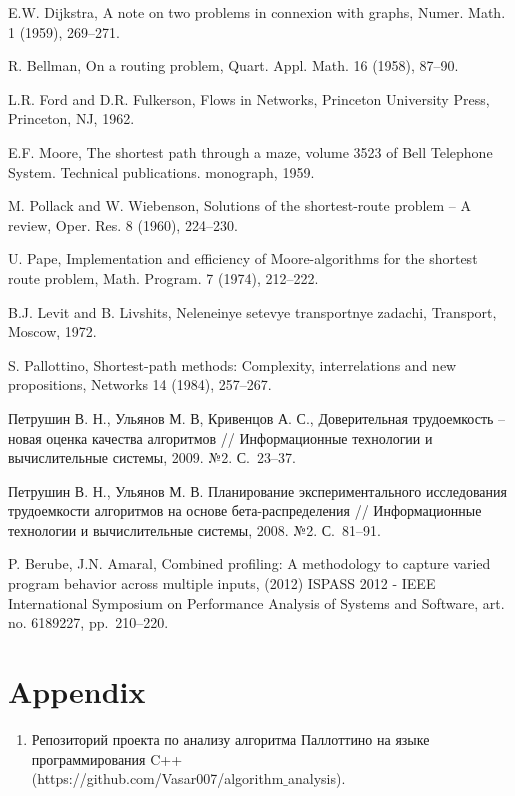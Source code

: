 \documentclass[a4paper]{article}
\begin{document}
\begin{enumerate}
	 E.W. Dijkstra, A note on two problems in connexion with graphs, Numer. Math. 1 (1959), 269–271.
	
	 R. Bellman, On a routing problem, Quart. Appl. Math. 16 (1958), 87–90.
	
	 L.R. Ford and D.R. Fulkerson, Flows in Networks, Princeton University Press, Princeton, NJ, 1962.
	
	 E.F. Moore, The shortest path through a maze, volume 3523 of Bell Telephone System. Technical publications. monograph, 1959.
	
	 M. Pollack and W. Wiebenson, Solutions of the shortest-route problem – A review, Oper. Res. 8 (1960), 224–230.
	
	 U. Pape, Implementation and efficiency of Moore-algorithms for the shortest route problem, Math. Program. 7 (1974), 212–222.
	
	 B.J. Levit and B. Livshits, Neleneinye setevye transportnye zadachi, Transport, Moscow, 1972.
	
	 S. Pallottino, Shortest-path methods: Complexity, interrelations and new propositions, Networks 14 (1984), 257–267.
	
	 Петрушин В. Н., Ульянов М. В, Кривенцов А. С., Доверительная трудоемкость – новая оценка качества алгоритмов // Информационные технологии и вычислительные системы, 2009. №2. С.~23--37.
	
	 Петрушин В. Н., Ульянов М. В. Планирование экспериментального исследования трудоемкости алгоритмов на основе бета-распределения // Информационные технологии и вычислительные системы, 2008. №2. С.~81--91.
	
	 P. Berube, J.N. Amaral, Combined profiling: A methodology to capture varied program behavior across multiple inputs, (2012) ISPASS 2012 - IEEE International Symposium on Performance Analysis of Systems and Software, art. no. 6189227, pp.~210--220.
\end{enumerate}

\appendix
\section{Appendix} \label{sec:appendix}

\begin{enumerate}
	\item Репозиторий проекта по анализу алгоритма Паллоттино на языке программирования C++ \\ (https://github.com/Vasar007/algorithm$\_$analysis). \label{appendix1}
\end{enumerate}
\end{document}
